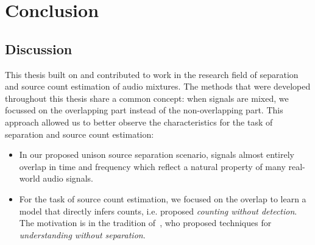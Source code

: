 \chapter{Conclusion}%
\label{cha:conclusion}


\section{Discussion}
This thesis built on and contributed to work in the research field of separation and source count estimation of audio mixtures. The methods that were developed throughout this thesis share a common concept: when signals are mixed, we focussed on the overlapping part instead of the non-overlapping part.
This approach allowed us to better observe the characteristics for the task of separation and source count estimation:

\begin{itemize}
  \item In our proposed unison source separation scenario, signals almost entirely overlap in time and frequency which reflect a natural property of many real-world audio signals.
  \item For the task of source count estimation, we focused on the overlap to learn a model that directly infers counts, i.e. proposed \emph{counting without detection}. The motivation is in the tradition of~\cite{scheirer99}, who proposed techniques for \emph{understanding without separation}.
\end{itemize}

